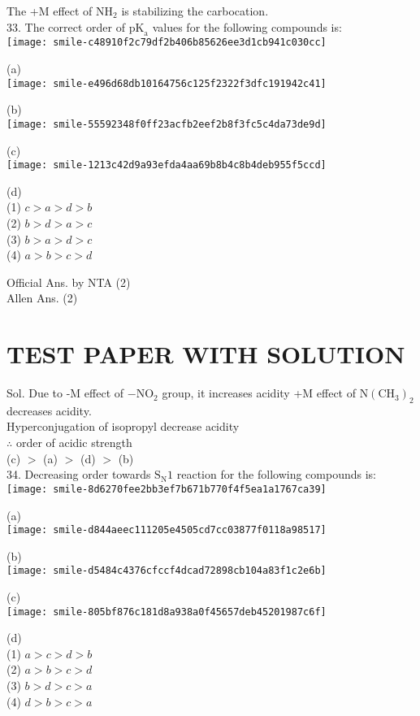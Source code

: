 \documentclass[10pt]{article}
\begin{document}
The +M effect of \(\mathrm{NH}_{2}\) is stabilizing the carbocation.\\
33. The correct order of \(\mathrm{pK}_{\mathrm{a}}\) values for the following compounds is:\\
\texttt{[image: smile-c48910f2c79df2b406b85626ee3d1cb941c030cc]}

(a)\\
\texttt{[image: smile-e496d68db10164756c125f2322f3dfc191942c41]}

(b)\\
\texttt{[image: smile-55592348f0ff23acfb2eef2b8f3fc5c4da73de9d]}

(c)\\
\texttt{[image: smile-1213c42d9a93efda4aa69b8b4c8b4deb955f5ccd]}

(d)\\
(1) \(c>a>d>b\)\\
(2) \(b>d>a>c\)\\
(3) \(b>a>d>c\)\\
(4) \(a>b>c>d\)

Official Ans. by NTA (2)\\
Allen Ans. (2)

\section*{TEST PAPER WITH SOLUTION}
Sol. Due to -M effect of \(-\mathrm{NO}_{2}\) group, it increases acidity +M effect of \(\mathrm{N}\left(\mathrm{CH}_{3}\right)_{2}\) decreases acidity.\\
Hyperconjugation of isopropyl decrease acidity\\
\(\therefore\) order of acidic strength\\
(c) \(>\) (a) \(>\) (d) \(>\) (b)\\
34. Decreasing order towards \(\mathrm{S}_{\mathrm{N}} 1\) reaction for the following compounds is:\\
\texttt{[image: smile-8d6270fee2bb3ef7b671b770f4f5ea1a1767ca39]}

(a)\\
\texttt{[image: smile-d844aeec111205e4505cd7cc03877f0118a98517]}

(b)\\
\texttt{[image: smile-d5484c4376cfccf4dcad72898cb104a83f1c2e6b]}

(c)\\
\texttt{[image: smile-805bf876c181d8a938a0f45657deb45201987c6f]}

(d)\\
(1) \(a>c>d>b\)\\
(2) \(a>b>c>d\)\\
(3) \(b>d>c>a\)\\
(4) \(d>b>c>a\)
\end{document}
